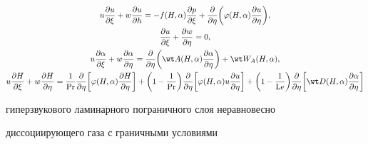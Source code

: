\begin{gather} 


u\frac{\partial u}{\partial\xi}+ 


w\frac{\partial u}{\partial h}=-f(H,\alpha) 


\frac{\partial p}{\partial\xi}+ 


\frac{\partial}{\partial\eta}\bigg( 


\varphi(H,\alpha)\frac{\partial u}{\partial\eta}\bigg),\notag \\ 


% 


\frac{\partial u}{\partial\xi}+ 


\frac{\partial w}{\partial\eta}=0,\notag \\ 


% 


u\frac{\partial\alpha}{\partial\xi}+ 


w\frac{\partial\alpha}{\partial\eta}= 


\frac{\partial}{\partial\eta}\bigg( 


\wt A(H,\alpha)\frac{\partial\alpha}{\partial\eta}\bigg) 


+\wt W_A(H,\alpha), \\ 


% 


u\frac{\partial H}{\partial\xi}+ 


w\frac{\partial H}{\partial\eta}=\frac{1}{\PR} 


\frac{\partial}{\partial\eta}\bigg[\varphi(H,\alpha) 


\frac{\partial H}{\partial\eta}\bigg]+\bigg( 


1-\frac{1}{\PR}\bigg)\frac{\partial}{\partial\eta} 


\bigg[\varphi(H,\alpha)u\frac{\partial u}{\partial\eta}\bigg]+ 


\bigg(1-\frac{1}{\Le}\bigg)\frac{\partial}{\partial\eta} 


\bigg[\wt D(H,\alpha) 


\frac{\partial\alpha}{\partial\eta}\bigg]\notag 


\end{gather} 


гиперзвукового ламинарного пограничного слоя неравновесно 


диссоциирующего газа \cite{2} с граничными условиями 


